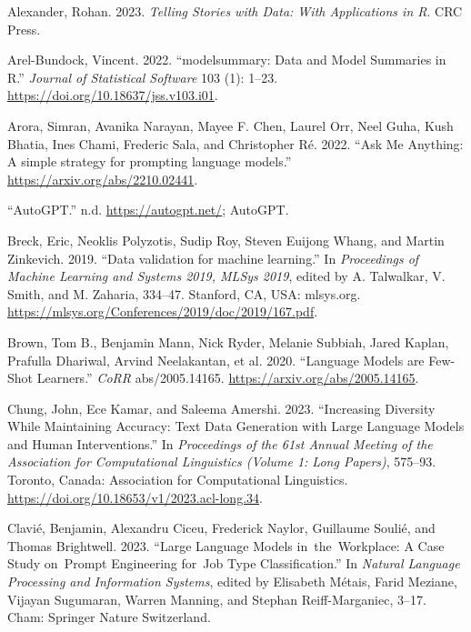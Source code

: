 \documentclass[
  letterpaper,
  DIV=11,
  numbers=noendperiod]{scrartcl}
\newlength{\cslhangindent}
\newlength{\cslentryspacingunit} %
\newenvironment{CSLReferences}[2] %
 {%
  \setlength{\parindent}{0pt}
  \ifodd #1
  \let\oldpar\par
  \def\par{\hangindent=\cslhangindent\oldpar}
  \fi
  \setlength{\parskip}{#2\cslentryspacingunit}
 }%
 {}
\begin{document}
\hypertarget{refs}{}
\begin{CSLReferences}{1}{0}
\leavevmode{}%
Alexander, Rohan. 2023. \emph{{Telling Stories with Data: With
Applications in R}}. CRC Press.

\leavevmode{}%
Arel-Bundock, Vincent. 2022. {``{modelsummary}: Data and Model Summaries
in {R}.''} \emph{Journal of Statistical Software} 103 (1): 1--23.
\url{https://doi.org/10.18637/jss.v103.i01}.

\leavevmode{}%
Arora, Simran, Avanika Narayan, Mayee F. Chen, Laurel Orr, Neel Guha,
Kush Bhatia, Ines Chami, Frederic Sala, and Christopher Ré. 2022.
{``{Ask Me Anything: A simple strategy for prompting language
models}.''} \url{https://arxiv.org/abs/2210.02441}.

\leavevmode{}%
{``{AutoGPT}.''} n.d. \url{https://autogpt.net/}; AutoGPT.

\leavevmode{}%
Breck, Eric, Neoklis Polyzotis, Sudip Roy, Steven Euijong Whang, and
Martin Zinkevich. 2019. {``{Data validation for machine learning}.''} In
\emph{Proceedings of Machine Learning and Systems 2019, MLSys 2019},
edited by A. Talwalkar, V. Smith, and M. Zaharia, 334--47. Stanford, CA,
USA: mlsys.org.
\url{https://mlsys.org/Conferences/2019/doc/2019/167.pdf}.

\leavevmode{}%
Brown, Tom B., Benjamin Mann, Nick Ryder, Melanie Subbiah, Jared Kaplan,
Prafulla Dhariwal, Arvind Neelakantan, et al. 2020. {``{Language Models
are Few-Shot Learners}.''} \emph{{CoRR}} abs/2005.14165.
\url{https://arxiv.org/abs/2005.14165}.

\leavevmode{}%
Chung, John, Ece Kamar, and Saleema Amershi. 2023. {``{Increasing
Diversity While Maintaining Accuracy: Text Data Generation with Large
Language Models and Human Interventions}.''} In \emph{Proceedings of the
61st Annual Meeting of the Association for Computational Linguistics
(Volume 1: Long Papers)}, 575--93. Toronto, Canada: Association for
Computational Linguistics.
\url{https://doi.org/10.18653/v1/2023.acl-long.34}.

\leavevmode{}%
Clavié, Benjamin, Alexandru Ciceu, Frederick Naylor, Guillaume Soulié,
and Thomas Brightwell. 2023. {``{Large Language Models in~the~Workplace:
A Case Study on~Prompt Engineering for~Job Type Classification}.''} In
\emph{Natural Language Processing and Information Systems}, edited by
Elisabeth Métais, Farid Meziane, Vijayan Sugumaran, Warren Manning, and
Stephan Reiff-Marganiec, 3--17. Cham: Springer Nature Switzerland.


\end{CSLReferences}
\end{document}
